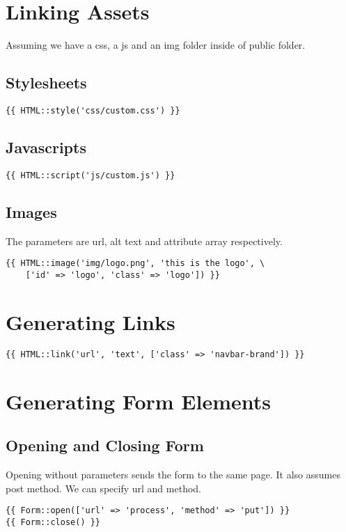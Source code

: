\documentclass[a4paper, 10pt]{article}
\begin{document}
\section{Linking Assets}
Assuming we have a css,  a js and an img folder inside of public folder.
\subsection{Stylesheets}
\begin{verbatim}
{{ HTML::style('css/custom.css') }}
\end{verbatim}
\subsection{Javascripts}
\begin{verbatim}
{{ HTML::script('js/custom.js') }}
\end{verbatim}
\subsection{Images}
The parameters are url, alt text and attribute array respectively.
\begin{verbatim}
{{ HTML::image('img/logo.png', 'this is the logo', \
    ['id' => 'logo', 'class' => 'logo']) }}
\end{verbatim}

\section{Generating Links}
\begin{verbatim}
{{ HTML::link('url', 'text', ['class' => 'navbar-brand']) }}
\end{verbatim}

\section{Generating Form Elements}
\subsection{Opening and Closing Form}
Opening without parameters sends the form to the same page.
It also assumes post method. We can specify url and method.
\begin{verbatim}
{{ Form::open(['url' => 'process', 'method' => 'put']) }}
{{ Form::close() }}
\end{verbatim}
\end{document}
